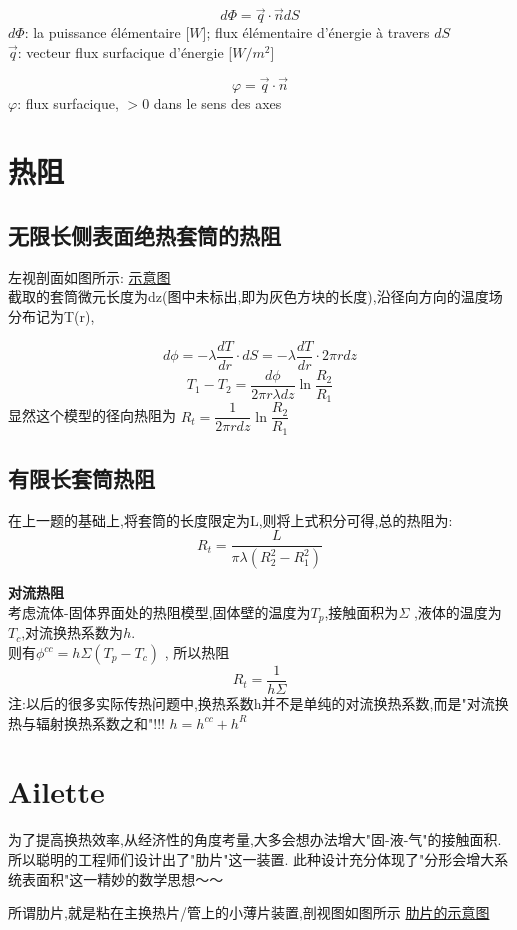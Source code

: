 \documentclass{article}
\begin{document}
\bigskip
$$ d\Phi = \vec{q} \cdot \vec{n} dS $$
$d\Phi$: la puissance \'el\'ementaire [$W$]; flux \'el\'ementaire d'\'energie \`a travers $dS$\\
$\vec{q}$: vecteur flux surfacique d'\'energie [$W/m^2$]

$$\varphi = \vec{q} \cdot \vec{n}$$
$\varphi$: flux surfacique, $>0$ dans le sens des axes

\section{热阻}
\subsection{无限长侧表面绝热套筒的热阻}
左视剖面如图所示:
\href{http://i.imgbox.com/X9xXlBML.png}{示意图}\\
截取的套筒微元长度为dz(图中未标出,即为灰色方块的长度),沿径向方向的温度场分布记为T(r),

$$
d\phi = -\lambda \dfrac{dT}{dr}\cdot dS = -\lambda \dfrac{dT}{dr} \cdot 2\pi rdz
$$
$$ T_1 - T_2 = \dfrac{d\phi}{2\pi r\lambda dz} \ln{\dfrac{R_2}{R_1}} $$
显然这个模型的径向热阻为 $R_t = \dfrac{1}{2\pi rdz} \ln{\dfrac{R_2}{R_1}}$

\subsection{有限长套筒热阻}
在上一题的基础上,将套筒的长度限定为L,则将上式积分可得,总的热阻为:
$$ R_t = \dfrac{L}{\pi \lambda(R_2^2 - R_1^2)} $$

\textbf{对流热阻}\\
考虑流体-固体界面处的热阻模型,固体壁的温度为$T_p$,接触面积为$\Sigma$ ,液体的温度为$T_c$,对流换热系数为$h$.\\
则有$\phi^{cc} = h\Sigma(T_p - T_c)$ , 所以热阻
$$R_t = \dfrac{1}{h\Sigma}$$
注:以后的很多实际传热问题中,换热系数h并不是单纯的对流换热系数,而是"对流换热与辐射换热系数之和"!!! $h=h^{cc} + h^R$

\section{Ailette}
为了提高换热效率,从经济性的角度考量,大多会想办法增大"固-液-气"的接触面积.
所以聪明的工程师们设计出了"肋片"这一装置.
此种设计充分体现了"分形会增大系统表面积"这一精妙的数学思想～～

所谓肋片,就是粘在主换热片/管上的小薄片装置,剖视图如图所示
\href{http://i.imgbox.com/UBJtc7TX.png}{肋片的示意图}
\end{document}
